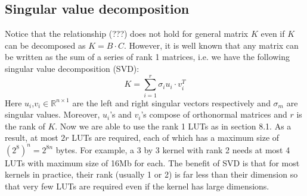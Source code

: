 \documentclass[12pt]{amsart}
\theoremstyle{definition}
\theoremstyle{remark}
\numberwithin{thm}{section}
\begin{document}
\subsection{Singular value decomposition}
Notice that the relationship (???) does not hold for general matrix $K$ even if $K$ can be decomposed as $K=B\cdot C$. However, it is well known that any matrix can be written as the sum of a series of rank 1 matrices, i.e. we have the following singular value decomposition (SVD): 
\[K=\sum_{i=1}^{r}\sigma_i u_i\cdot v_i^T\]
Here $u_i$,$v_i\in\mathbb{R}^{n\times 1}$ are the left and right singular vectors respectively and $\sigma_m$ are singular values. Moreover, $u_i$'s and $v_i$'s compose of orthonormal matrices and $r$ is the rank of $K$. Now we are able to use the rank 1 LUTs as in section 8.1. As a result, at most $2r$ LUTs are required, each of which has a maximum size of $(2^8)^n=2^{8n}$ bytes. For example, a 3 by 3 kernel with rank 2 needs at most 4 LUTs with maximum size of 16Mb for each. The benefit of SVD is that for most kernels in practice, their rank (usually 1 or 2) is far less than their dimension so that very few LUTs are required even if the kernel has large dimensions. 
\end{document}
